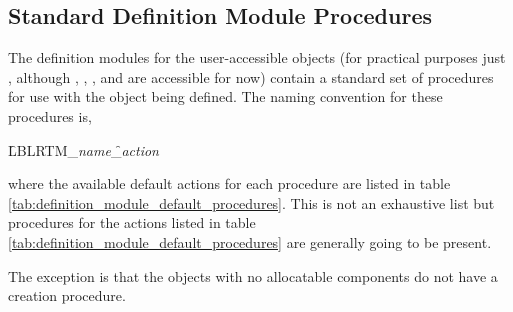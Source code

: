 \subsection{Standard Definition Module Procedures}

The definition modules for the user-accessible objects (for practical purposes just \File, although \Layer, \Fhdr, \Panel, and \Phdr are accessible for now) contain a standard set of procedures for use with the object being defined. The naming convention for these procedures is,

\hspace{0.4cm}\f{LBLRTM\_}\textit{name}\f{\_}\textit{action}

where the available default actions for each procedure are listed in table \ref{tab:definition_module_default_procedures}. This is not an exhaustive list but procedures for the actions listed in table \ref{tab:definition_module_default_procedures} are generally going to be present.

The exception is that the objects with no allocatable components do not have a creation procedure.

